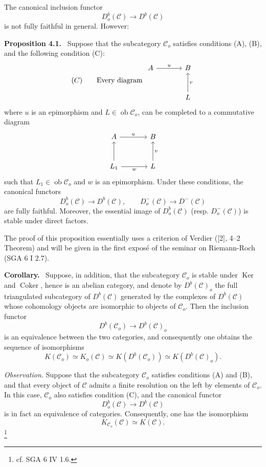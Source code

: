 \documentclass[11pt]{article}
\newenvironment{statement}[1]{\par\medskip\noindent\textbf{#1.}\ }{\par\medskip}
\providecommand{\Ker}{\operatorname{Ker}}
\providecommand{\Coker}{\operatorname{Coker}}
\providecommand{\Ob}{\operatorname{ob}}
\providecommand{\cC}{\mathcal C}
\providecommand{\Ker}{\operatorname{Ker}}
\providecommand{\Coker}{\operatorname{Coker}}
\providecommand{\Ker}{\operatorname{Ker}}
\providecommand{\Coker}{\operatorname{Coker}}
\providecommand{\Ob}{\operatorname{ob}}
\providecommand{\cC}{\mathcal C}
\providecommand{\Ob}{\operatorname{Ob}}
\providecommand{\Ob}{\operatorname{ob}}
\begin{document}
The canonical inclusion functor
\[
D_o^b(\cC)\longrightarrow D^b(\cC)
\]
is not fully faithful in general. However:

\begin{statement}{Proposition 4.1}
Suppose that the subcategory $\cC_o$ satisfies conditions (A), (B), and the following condition (C):
\[
(C)\qquad
\text{Every diagram }
\begin{tikzcd}[column sep=large,row sep=large]
A \arrow[r,"u"]&B\\
&L \arrow[u,"v"']
\end{tikzcd}
\]
where $u$ is an epimorphism and $L\in\Ob\cC_o$, can be completed to a commutative diagram
\[
\begin{tikzcd}[column sep=large,row sep=large]
A \arrow[r,"u"]&B\\
L_1 \arrow[u] \arrow[r,"w"']&L \arrow[u,"v"']
\end{tikzcd}
\]
such that $L_1\in\Ob\cC_o$ and $w$ is an epimorphism. Under these conditions, the canonical functors
\[
D_o^b(\cC)\longrightarrow D^b(\cC),\qquad
D_o^-(\cC)\longrightarrow D^-(\cC)
\]
are fully faithful. Moreover, the essential image of $D_o^b(\cC)$ (resp. $D_o^-(\cC)$) is stable under direct factors.
\end{statement}

The proof of this proposition essentially uses a criterion of Verdier ([2], 4--2 Theorem) and will be given in the first exposé of the seminar on Riemann-Roch (SGA 6 I 2.7).

\begin{statement}{Corollary}
Suppose, in addition, that the subcategory $\cC_o$ is stable under $\Ker$ and $\Coker$, hence is an abelian category, and denote by $D^b(\cC)_o$ the full triangulated subcategory of $D^b(\cC)$ generated by the complexes of $D^b(\cC)$ whose cohomology objects are isomorphic to objects of $\cC_o$. Then the inclusion functor
\[
D^b(\cC_o)\longrightarrow D^b(\cC)_o
\]
is an equivalence between the two categories, and consequently one obtains the sequence of isomorphisms
\[
K(\cC_o)\simeq K_o(\cC)\simeq K(D^b(\cC_o))\simeq K(D^b(\cC)_o).
\tag{*}
\]
\end{statement}

\emph{Observation.} Suppose that the subcategory $\cC_o$ satisfies conditions (A) and (B), and that every object of $\cC$ admits a finite resolution on the left by elements of $\cC_o$. In this case, $\cC_o$ also satisfies condition (C), and the canonical functor
\[
D_o^b(\cC)\longrightarrow D^b(\cC)
\]
is in fact an equivalence of categories. Consequently, one has the isomorphism
\[
K_{\cC_o}(\cC)\simeq K(\cC).
\]
\footnote{cf. SGA 6 IV 1.6.}
\end{document}
